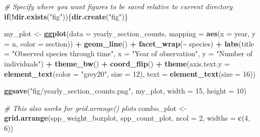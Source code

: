 \documentclass[
  10pt,
  letterpaper,
  twoside,
  openright]{book}
\newenvironment{Shaded}{\begin{snugshade}}{\end{snugshade}}
\newcommand{\AttributeTok}[1]{\textcolor[rgb]{0.13,0.29,0.53}{#1}}
\newcommand{\CommentTok}[1]{\textcolor[rgb]{0.56,0.35,0.01}{\textit{#1}}}
\newcommand{\ControlFlowTok}[1]{\textcolor[rgb]{0.13,0.29,0.53}{\textbf{#1}}}
\newcommand{\DecValTok}[1]{\textcolor[rgb]{0.00,0.00,0.81}{#1}}
\newcommand{\FunctionTok}[1]{\textcolor[rgb]{0.13,0.29,0.53}{\textbf{#1}}}
\newcommand{\NormalTok}[1]{#1}
\newcommand{\OtherTok}[1]{\textcolor[rgb]{0.56,0.35,0.01}{#1}}
\newcommand{\SpecialCharTok}[1]{\textcolor[rgb]{0.81,0.36,0.00}{\textbf{#1}}}
\newcommand{\StringTok}[1]{\textcolor[rgb]{0.31,0.60,0.02}{#1}}
\begin{document}
\begin{Shaded}
\begin{Highlighting}[]
\CommentTok{\# Specify where you want figures to be saved relative to current directory}
\ControlFlowTok{if}\NormalTok{(}\SpecialCharTok{!}\FunctionTok{dir.exists}\NormalTok{(}\StringTok{"fig"}\NormalTok{))\{}\FunctionTok{dir.create}\NormalTok{(}\StringTok{"fig"}\NormalTok{)\}}

\NormalTok{my\_plot }\OtherTok{\textless{}{-}} \FunctionTok{ggplot}\NormalTok{(}\AttributeTok{data =}\NormalTok{ yearly\_section\_counts, }
                  \AttributeTok{mapping =} \FunctionTok{aes}\NormalTok{(}\AttributeTok{x =}\NormalTok{ year, }\AttributeTok{y =}\NormalTok{ n, }\AttributeTok{color =}\NormalTok{ section)) }\SpecialCharTok{+}
              \FunctionTok{geom\_line}\NormalTok{() }\SpecialCharTok{+}
              \FunctionTok{facet\_wrap}\NormalTok{(}\SpecialCharTok{\textasciitilde{}}\NormalTok{ species) }\SpecialCharTok{+}
              \FunctionTok{labs}\NormalTok{(}\AttributeTok{title =} \StringTok{"Observed species through time"}\NormalTok{,}
                    \AttributeTok{x =} \StringTok{"Year of observation"}\NormalTok{,}
                    \AttributeTok{y =} \StringTok{"Number of individuals"}\NormalTok{) }\SpecialCharTok{+}
              \FunctionTok{theme\_bw}\NormalTok{() }\SpecialCharTok{+}
              \FunctionTok{coord\_flip}\NormalTok{() }\SpecialCharTok{+} 
              \FunctionTok{theme}\NormalTok{(}\AttributeTok{axis.text.y =} \FunctionTok{element\_text}\NormalTok{(}\AttributeTok{color =} \StringTok{"grey20"}\NormalTok{, }\AttributeTok{size =} \DecValTok{12}\NormalTok{),}
                    \AttributeTok{text =} \FunctionTok{element\_text}\NormalTok{(}\AttributeTok{size =} \DecValTok{16}\NormalTok{))}

\FunctionTok{ggsave}\NormalTok{(}\StringTok{"fig/yearly\_section\_counts.png"}\NormalTok{, my\_plot, }\AttributeTok{width =} \DecValTok{15}\NormalTok{, }\AttributeTok{height =} \DecValTok{10}\NormalTok{)}

\CommentTok{\# This also works for grid.arrange() plots}
\NormalTok{combo\_plot }\OtherTok{\textless{}{-}} \FunctionTok{grid.arrange}\NormalTok{(spp\_weight\_boxplot, spp\_count\_plot, }
                           \AttributeTok{ncol =} \DecValTok{2}\NormalTok{, }\AttributeTok{widths =} \FunctionTok{c}\NormalTok{(}\DecValTok{4}\NormalTok{, }\DecValTok{6}\NormalTok{))}
\end{Highlighting}
\end{Shaded}
\end{document}
